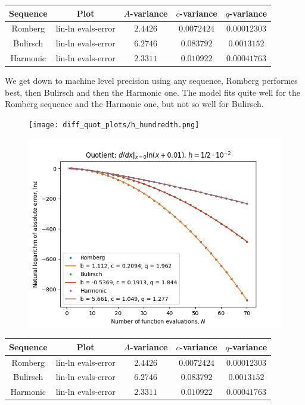 \begin{table}[H]
    \centering
    \begin{tabular}{c|c||c|c|c}
Sequence & Plot & \(A\)-variance & \(c\)-variance & \(q\)-variance\\\hline
Romberg & lin-ln evals-error & \(2.4426\) & \(0.0072424\) & \(0.00012303\) \\
Bulirsch & lin-ln evals-error & \(6.2746\) & \(0.083792\) & \(0.0013152\) \\
Harmonic & lin-ln evals-error & \(2.3311\) & \(0.010922\) & \(0.00041763\) \\
    \end{tabular}
    \label{tab:my_label}
\end{table}

We get down to machine level precision using any sequence, Romberg performes best, then Bulirsch and then the Harmonic one. The model fits quite well for the Romberg sequence and the Harmonic one, but not so well for Bulirsch.

\begin{figure}[H]
\centering
\begin{minipage}{0.45\textwidth}
\centering
\texttt{[image: diff\_quot\_plots/h\_hundredth.png]}
\end{minipage}
\begin{minipage}{0.45\textwidth}
\centering
\includegraphics[scale=0.45]{diff_quot_plots/h_hundredth_hp_trend.png}
\end{minipage}
\end{figure}

\begin{table}[H]
    \centering
    \begin{tabular}{c|c||c|c|c}
Sequence & Plot & \(A\)-variance & \(c\)-variance & \(q\)-variance\\\hline
Romberg & lin-ln evals-error & \(2.4426\) & \(0.0072424\) & \(0.00012303\) \\
Bulirsch & lin-ln evals-error & \(6.2746\) & \(0.083792\) & \(0.0013152\) \\
Harmonic & lin-ln evals-error & \(2.3311\) & \(0.010922\) & \(0.00041763\) \\
    \end{tabular}
    \label{tab:my_label}
\end{table}

